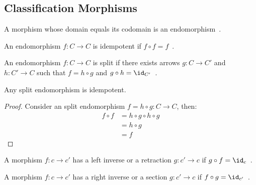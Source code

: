 \subsection{Classification Morphisms}

\begin{definition}[Endomorphism]
  A morphism whose domain equals its codomain is an
  endomorphism~\parencite[p.~7]{riehl:category_theory_in_context}.
\end{definition}

\begin{definition}[Idempotent]
  An endomorphism $f:C\to C$ is idempotent if $f\circ f =
  f$~\parencite[p.~20]{lane:working_mathematician}.
\end{definition}

\begin{definition}[Split]
  An endomorphism $f:C\to C$ is split if there exists arrows $g:C\to C'$ and
  $h:C'\to C$ such that $f=h\circ g$ and $g\circ h=
  \id_{C'}$~\parencite[p.~20]{lane:working_mathematician}.
\end{definition}

\begin{theorem}
  Any split endomorphism is idempotent.

  \begin{proof}
    Consider an split endomorphism $f=h\circ g:C\to C$, then:
    \[
      \begin{aligned}
        f\circ f &= h\circ g \circ h\circ g\\
        &= h\circ g\\
        &= f
      \end{aligned}
    \]
  \end{proof}
  \vspace{-\baselineskip}
\end{theorem}

\begin{definition}
  A morphism $f: c\to c'$ has a left inverse or a retraction $g: c'\to c$ if
  $g\circ f = \id_c$~\parencite[p.~19]{lane:working_mathematician}.
\end{definition}

\begin{definition}
  A morphism $f: c\to c'$ has a right inverse or a section $g: c'\to c$ if
  $f\circ g = \id_{c'}$~\parencite[p.~19]{lane:working_mathematician}.
\end{definition}

